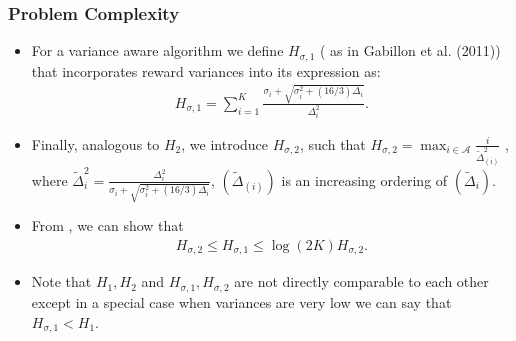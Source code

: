 \begin{frame}
\frametitle{Problem Complexity}
\begin{itemize}
\item<1-> For a variance aware algorithm we define $H_{\sigma , 1}$ ( as in {Gabillon et al. (2011)}) that incorporates reward variances into its expression as:
\begin{align*}
 H_{\sigma,1}=\sum_{i=1}^{K}\frac{\sigma_{i}+\sqrt{\sigma_{i}^{2}+(16/3)\Delta_{i}}}{\Delta_{i}^{2}}.
\end{align*}

\item<2-> Finally, analogous to $H_{2}$, we introduce $H_{\sigma,2}$, such that $
H_{\sigma,2}=\max_{i\in \mathcal{A}} \frac{i}{\tilde{\Delta}_{(i)}^{2}}$ , where $\tilde{\Delta}_{i}^{2}=\frac{\Delta_{i}^{2}}{\sigma_{i}+\sqrt{\sigma_{i}^{2}+(16/3)\Delta_{i}}}$,  $(\tilde{\Delta}_{(i)})$ is an increasing ordering of $(\tilde{\Delta}_{i})$.

\item<3-> From \cite{audibert2010best}, we can show that
\begin{align*}
H_{\sigma,2}\le H_{\sigma,1} \le \log(2K) H_{\sigma,2}.
\end{align*}


\item<4-> Note that $H_1 , H_2 $ and $H_{\sigma,1}, H_{\sigma,2}$ are not directly comparable to each other except in a special case when variances are very low we can say that $H_{\sigma,1} < H_{1} $.

\end{itemize}
\end{frame}



